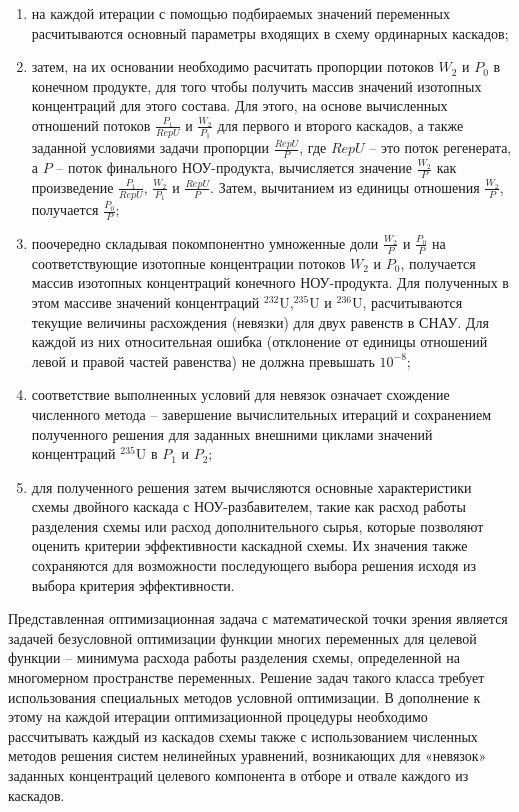 \begin{enumerate}
    \item  на каждой итерации с помощью подбираемых значений переменных расчитываются основный параметры входящих в схему ординарных каскадов;
    \item  затем, на их основании необходимо расчитать пропорции потоков $W_2$ и $P_0$ в конечном продукте, для того чтобы получить массив значений изотопных концентраций для этого состава. Для этого, на основе вычисленных отношений потоков $\frac{P_{1}}{RepU}$ и $\frac{W_{2}}{P_{1}}$ для первого и второго каскадов, а также заданной условиями задачи пропорции $\frac{RepU}{P}$, где $RepU$ -- это поток регенерата, а $P$ -- поток финального НОУ-продукта, вычисляется значение $\frac{W_{2}}{P}$ как произведение $\frac{P_{1}}{RepU}$, $\frac{W_{2}}{P_{1}}$ и $\frac{RepU}{P}$. Затем, вычитанием из единицы отношения $\frac{W_{2}}{P}$, получается $\frac{P_{0}}{P}$;
    \item поочередно складывая покомпонентно умноженные доли $\frac{W_{2}}{P}$ и $\frac{P_{0}}{P}$ на соответствующие изотопные концентрации потоков $W_2$ и $P_0$, получается массив изотопных концентраций конечного НОУ-продукта. Для полученных в этом массиве значений концентраций $^{232}$U,$^{235}$U и $^{236}$U, расчитываются текущие величины расхождения (невязки) для двух равенств в СНАУ. Для каждой из них относительная ошибка (отклонение от единицы отношений левой и правой частей равенства) не должна превышать $10^{-8}$;
    \item соответствие выполненных условий для невязок означает схождение численного метода -- завершение вычислительных итераций и сохранением полученного решения для заданных внешними циклами значений концентраций $^{235}$U в $P_1$ и $P_2$;
    \item для полученного решения затем вычисляются основные характеристики схемы двойного каскада с НОУ-разбавителем, такие как расход работы разделения схемы или расход дополнительного сырья, которые позволяют оценить критерии эффективности каскадной схемы. Их значения также сохраняются для возможности последующего выбора решения исходя из выбора критерия эффективности.
\end{enumerate}

Представленная оптимизационная задача с математической точки зрения является задачей безусловной оптимизации функции многих переменных для целевой функции -- минимума расхода работы разделения схемы, определенной на многомерном пространстве переменных. Решение задач такого класса требует использования специальных методов условной оптимизации. В дополнение к этому на каждой итерации оптимизационной процедуры необходимо рассчитывать каждый из каскадов схемы также с использованием численных методов решения систем нелинейных уравнений, возникающих для «невязок» заданных концентраций целевого компонента в отборе и отвале каждого из каскадов.

